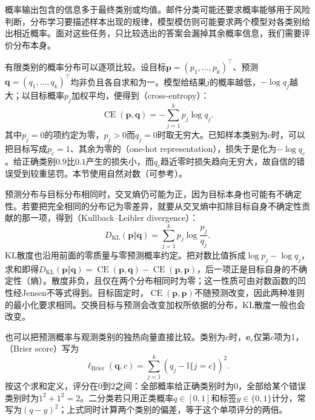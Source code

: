 概率输出包含的信息多于最终类别或均值。邮件分类可能还要求概率能够用于风险判断，分布学习要描述样本出现的规律，模型模仿则可能要求两个模型对各类别给出相近概率。面对这些任务，只比较选出的答案会漏掉其余概率信息，我们需要评价分布本身。

有限类别的概率分布可以逐项比较。设目标$\bm{p}=(p_1,\ldots,p_k)^{\top}$、预测$\bm{q}=(q_1,\ldots,q_k)^{\top}$均非负且各自求和为一。模型给结果$j$的概率越低，$-\log q_j$越大；以目标概率$p_j$加权平均，便得到（cross-entropy）：
\begin{equation}
  \operatorname{CE}(\bm{p},\bm{q})=-\sum_{j=1}^{k}p_j\log q_j.
  \label{eq:models-cross-entropy}
\end{equation}
其中$p_j=0$的项约定为零，$p_j>0$而$q_j=0$时取无穷大。已知样本类别为$c$时，可以把目标写成$p_c=1$、其余为零的（one-hot representation），损失于是化为$-\log q_c$。给正确类别$0.9$比$0.1$产生的损失小，而$q_c$趋近零时损失趋向无穷大，故自信的错误受到较重惩罚。本节使用自然对数（可参考）。

预测分布与目标分布相同时，交叉熵仍可能为正，因为目标本身也可能有不确定性。若要把完全相同的分布记为零差异，就要从交叉熵中扣除目标自身不确定性贡献的那一项，得到（Kullback--Leibler divergence）：
\begin{equation}
  D_{\mathrm{KL}}(\bm{p}\Vert\bm{q})
  =\sum_{j=1}^{k}p_j\log\frac{p_j}{q_j}.
  \label{eq:models-kl}
\end{equation}
KL散度也沿用前面的零质量与零预测概率约定。把对数比值拆成$\log p_j-\log q_j$，求和即得$D_{\mathrm{KL}}(\bm{p}\Vert\bm{q})=\operatorname{CE}(\bm{p},\bm{q})-\operatorname{CE}(\bm{p},\bm{p})$，后一项正是目标自身的不确定性（熵）。散度非负，且仅在两个分布相同时为零；这一性质可由对数函数的凹性经Jensen不等式得到。目标固定时，$\operatorname{CE}(\bm{p},\bm{p})$不随预测改变，因此两种准则的最小化要求相同。交换目标与预测会改变加权所依据的分布，KL散度一般也会改变。

也可以把预测概率与观测类别的独热向量直接比较。类别为$c$时，$\bm{e}_c$仅第$c$项为1，（Brier score）写为
\begin{equation}
  \ell_{\mathrm{Brier}}(\bm{q},c)
  =\sum_{j=1}^{k}(q_j-\mathbb{I}\{j=c\})^2.
  \label{eq:models-brier}
\end{equation}
按这个求和定义，评分在$0$到$2$之间：全部概率给正确类别时为$0$，全部给某个错误类别时为$1^2+1^2=2$。二分类若只用正类概率$q\in[0,1]$和标签$y\in\{0,1\}$计分，常写为$(q-y)^2$；上式同时计算两个类别的偏差，等于这个单项评分的两倍。

